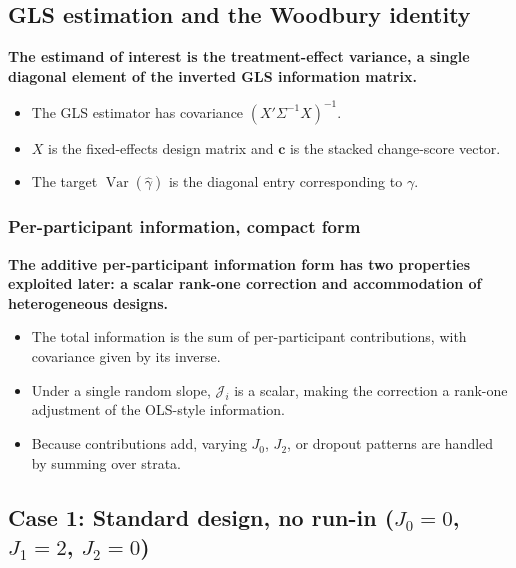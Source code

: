 \documentclass[
  11pt,
]{article}
\begin{document}
\subsection{GLS estimation and the Woodbury identity}\label{gls-estimation-and-the-woodbury-identity}

\textbf{The estimand of interest is the treatment-effect variance, a single diagonal element of the inverted GLS information matrix.}

\begin{itemize}\setlength{\itemsep}{2pt}\setlength{\parskip}{0pt}
\item The GLS estimator has covariance $(X' \Sigma^{-1} X)^{-1}$.
\item $X$ is the fixed-effects design matrix and $\mathbf{c}$ is the stacked change-score vector.
\item The target $\mathop{\mathrm{Var}}(\hat{\gamma})$ is the diagonal entry corresponding to $\gamma$.
\end{itemize}

\subsubsection{Per-participant information, compact form}\label{per-participant-information-compact-form}

\textbf{The additive per-participant information form has two properties exploited later: a scalar rank-one correction and accommodation of heterogeneous designs.}

\begin{itemize}\setlength{\itemsep}{2pt}\setlength{\parskip}{0pt}
\item The total information is the sum of per-participant contributions, with covariance given by its inverse.
\item Under a single random slope, $\mathcal{J}_i$ is a scalar, making the correction a rank-one adjustment of the OLS-style information.
\item Because contributions add, varying $J_0$, $J_2$, or dropout patterns are handled by summing over strata.
\end{itemize}

\subsection{\texorpdfstring{Case 1: Standard design, no run-in (\(J_0=0\), \(J_1=2\), \(J_2=0\))}{Case 1: Standard design, no run-in (J\_0=0, J\_1=2, J\_2=0)}}\label{case-1-standard-design-no-run-in-j_00-j_12-j_20}
\end{document}
